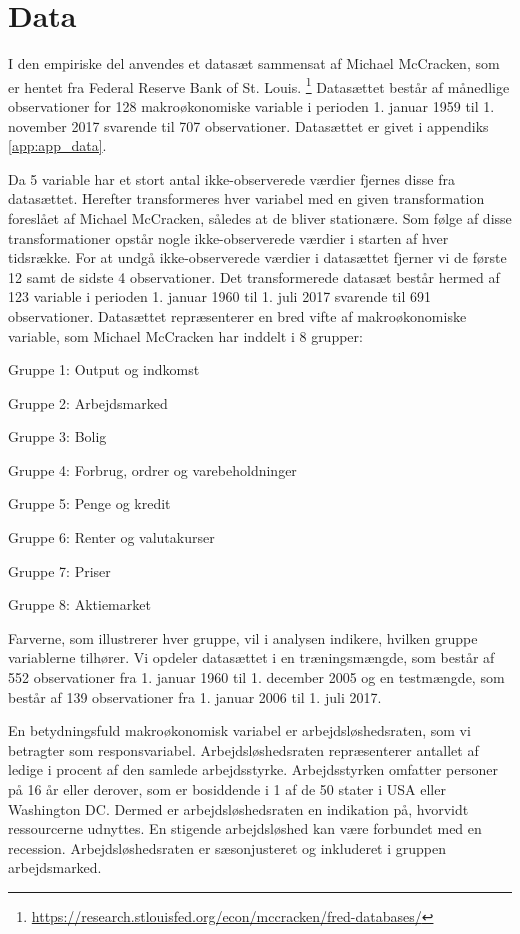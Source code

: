 \chapter{Data} \label{ch:data}
I den empiriske del anvendes et datasæt sammensat af Michael McCracken, som er hentet fra Federal Reserve Bank of St. Louis. \footnote{\url{https://research.stlouisfed.org/econ/mccracken/fred-databases/}}
Datasættet består af månedlige observationer for 128 makroøkonomiske variable i perioden 1. januar 1959 til 1. november 2017 svarende til 707 observationer.
Datasættet er givet i appendiks \ref{app:app_data}.

Da 5 variable har et stort antal ikke-observerede værdier fjernes disse fra datasættet.
Herefter transformeres hver variabel med en given transformation foreslået af Michael McCracken, således at de bliver stationære.
Som følge af disse transformationer opstår nogle ikke-observerede værdier i starten af hver tidsrække.
For at undgå ikke-observerede værdier i datasættet fjerner vi de første 12 samt de sidste 4 observationer.
Det transformerede datasæt består hermed af 123 variable i perioden 1. januar 1960 til 1. juli 2017 svarende til 691 observationer.
Datasættet repræsenterer en bred vifte af makroøkonomiske variable, som Michael McCracken har inddelt i 8 grupper:
%
\begin{description}
\item Gruppe 1: Output og indkomst 
\item Gruppe 2: Arbejdsmarked 
\item Gruppe 3: Bolig 
\item Gruppe 4: Forbrug, ordrer og varebeholdninger  
\item Gruppe 5: Penge og kredit 
\item Gruppe 6: Renter og valutakurser 
\item Gruppe 7: Priser 
\item Gruppe 8: Aktiemarket 
\end{description} 
%
Farverne, som illustrerer hver gruppe, vil i analysen indikere, hvilken gruppe variablerne tilhører.
Vi opdeler datasættet i en træningsmængde, som består af 552 observationer fra 1. januar 1960 til 1. december 2005 og en testmængde, som består af 139 observationer fra 1. januar 2006 til 1. juli 2017. 

En betydningsfuld makroøkonomisk variabel er arbejdsløshedsraten, som vi betragter som responsvariabel. 
Arbejdsløshedsraten repræsenterer antallet af ledige i procent af den samlede arbejdsstyrke.
Arbejdsstyrken omfatter personer på 16 år eller derover, som er bosiddende i 1 af de 50 stater i USA eller Washington DC.
Dermed er arbejdsløshedsraten en indikation på, hvorvidt ressourcerne udnyttes.
En stigende arbejdsløshed kan være forbundet med en recession.
Arbejdsløshedsraten er sæsonjusteret og inkluderet i gruppen arbejdsmarked.

